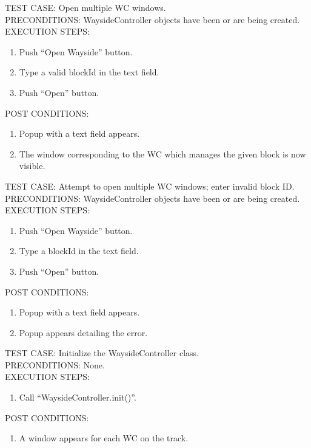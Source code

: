 \documentclass{scrreprt}
\begin{document}
        TEST CASE: Open multiple WC windows.\\
        PRECONDITIONS: WaysideController objects have been or are being created.\\
        EXECUTION STEPS: \begin{enumerate}
            \item Push ``Open Wayside'' button.
            \item Type a valid blockId in the text field.
            \item Push ``Open'' button.
        \end{enumerate}
        POST CONDITIONS: \begin{enumerate}
            \item Popup with a text field appears.
            \item The window corresponding to the WC which manages the given block is now visible.
        \end{enumerate}

        TEST CASE: Attempt to open multiple WC windows; enter invalid block ID.\\
        PRECONDITIONS: WaysideController objects have been or are being created.\\
        EXECUTION STEPS: \begin{enumerate}
            \item Push ``Open Wayside'' button.
            \item Type a blockId in the text field.
            \item Push ``Open'' button.
        \end{enumerate}
        POST CONDITIONS: \begin{enumerate}
            \item Popup with a text field appears.
            \item Popup appears detailing the error.
        \end{enumerate}

        TEST CASE: Initialize the WaysideController class.\\
        PRECONDITIONS: None.\\
        EXECUTION STEPS: \begin{enumerate}
            \item Call ``WaysideController.init()''.
        \end{enumerate}
        POST CONDITIONS: \begin{enumerate}
            \item A window appears for each WC on the track.
        \end{enumerate}
\end{document}
